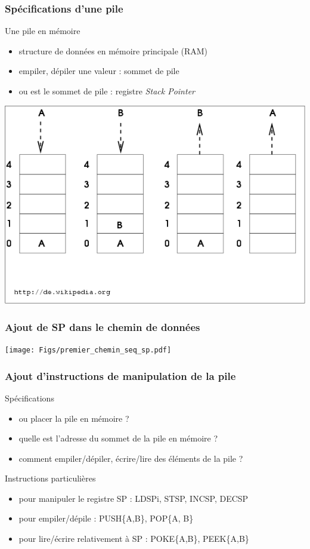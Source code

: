 \documentclass{beamer}
\begin{document}
\begin{frame}
\frametitle{Spécifications d'une pile}
\begin{block}{Une pile en mémoire}
\begin{itemize}
\item structure de données en mémoire principale (RAM)
\item empiler, dépiler une valeur : sommet de pile
\item ou est le sommet de pile : registre \emph{Stack Pointer}
\end{itemize}
\end{block}

\centering\includegraphics[width=0.5\linewidth]{Figs/Lifo.png}

\end{frame}

\begin{frame}
\frametitle{Ajout de SP dans le chemin de données}

\centering\texttt{[image: Figs/premier\_chemin\_seq\_sp.pdf]}

\end{frame}

\begin{frame}
\frametitle{Ajout d'instructions de manipulation de la pile}

\begin{block}{Spécifications}
\begin{itemize}
\item ou placer la pile en mémoire ?
\item quelle est l'adresse du sommet de la pile en mémoire ?
\item comment empiler/dépiler, écrire/lire des éléments de la pile ?
\end{itemize}
\end{block}

\begin{block}{Instructions particulières}
\begin{itemize}
\item pour manipuler le registre SP : LDSPi, STSP, INCSP, DECSP
\item pour empiler/dépile : PUSH\{A,B\}, POP\{A, B\}
\item pour lire/écrire relativement à SP : POKE\{A,B\}, PEEK\{A,B\}
\end{itemize}
\end{block}
\end{frame}
\end{document}
